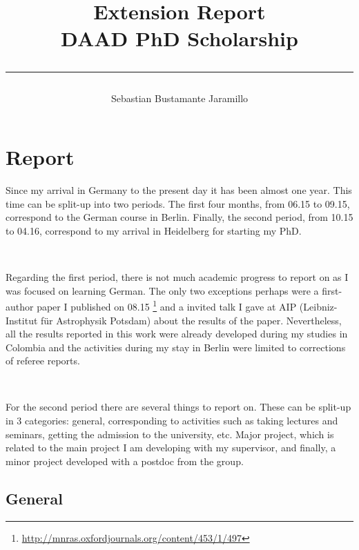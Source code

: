 \documentclass[a4,useAMS,usenatbib,usegraphicx,12pt]{article}
\title{{\textbf{Extension Report}}\\ 
				DAAD PhD Scholarship\\ 
				\color{black}\rule{15cm}{0.5mm}}
\author{Sebastian Bustamante Jaramillo}
\date{}
\begin{document}
\maketitle

\tableofcontents
 
\newpage 

\section{Report}

Since my arrival in Germany to the present day it has been almost one year. This
time can be split-up into two periods. The first four months, from 06.15 to 09.15,
correspond to the German course in Berlin. Finally, the second period, from 10.15 
to 04.16, correspond to my arrival in Heidelberg for starting my PhD.

\

Regarding the first period, there is not much academic progress to report on as 
I was focused on learning German. The only two exceptions perhaps were a 
first-author paper I pu\-blished on 08.15 \citep{Bustamante15}
\footnote{\url{http://mnras.oxfordjournals.org/content/453/1/497}} and a invited
talk I gave at AIP (Leibniz-Institut f\"ur Astrophysik Potsdam) about the 
results of the paper. Nevertheless, all the results reported in this work were 
already developed during my studies in Colombia and the activities during my 
stay in Berlin were limited to corrections of referee reports.

\

For the second period there are several things to report on. These can be split-up 
in 3 categories: general, corresponding to activities such as taking lectures 
and seminars, getting the admission to the university, etc. Major project, which 
is related to the main project I am developing with my supervisor, and finally, 
a minor project developed with a postdoc from the group.


\subsection{General}
\end{document}
